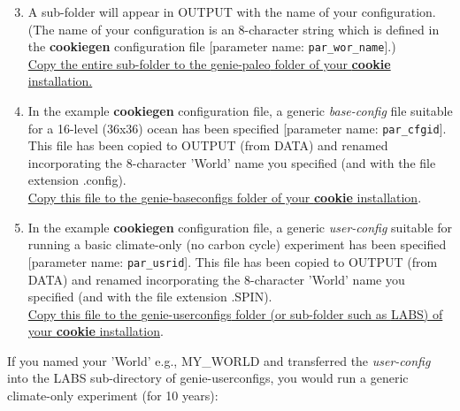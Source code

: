 \begin{enumerate}
\setcounter{enumi}{2}

\vspace{2mm}
\item A sub-folder will appear in \textsf{\footnotesize OUTPUT} with the name of your configuration.
\\(The name of your configuration is an 8-character string which is defined in the \textbf{cookiegen} configuration file [parameter name: \texttt{\small par\_wor\_name}].)
\\\uline{Copy the entire sub-folder to the \textsf{\footnotesize genie-paleo} folder of your \textbf{cookie} installation.}

\newpage

\vspace{2mm}
\item In the example \textbf{cookiegen} configuration file, a generic \textit{base-config} file suitable for a 16-level (36x36) ocean has been specified [parameter name: \texttt{\small  par\_cfgid}]. This file has been copied to \textsf{\footnotesize OUTPUT} (from \textsf{\footnotesize DATA}) and renamed incorporating the 8-character 'World' name you specified (and with the file extension \textsf{\footnotesize .config}).
\\\uline{Copy this file to the \textsf{\footnotesize genie-baseconfigs} folder of your \textbf{cookie} installation}.

\vspace{2mm}
\item In the example \textbf{cookiegen} configuration file, a generic \textit{user-config} suitable for running a basic climate-only (no carbon cycle) experiment has been specified [parameter name: \texttt{\small  par\_usrid}]. This file has been copied to \textsf{\footnotesize OUTPUT} (from \textsf{\footnotesize DATA}) and renamed incorporating the 8-character 'World' name you specified (and with the file extension \textsf{\footnotesize .SPIN}).
\\\uline{Copy this file to the \textsf{\footnotesize genie-userconfigs} folder (or sub-folder such as \textsf{\footnotesize LABS}) of your \textbf{cookie} installation}.

\end{enumerate}

\vspace{2mm}
\noindent If you named your 'World' e.g., \textsf{\footnotesize MY\_WORLD} and transferred the \textit{user-config} into the \textsf{\footnotesize LABS} sub-directory of \textsf{\footnotesize genie-userconfigs}, you would run a generic climate-only experiment (for 10 years):

